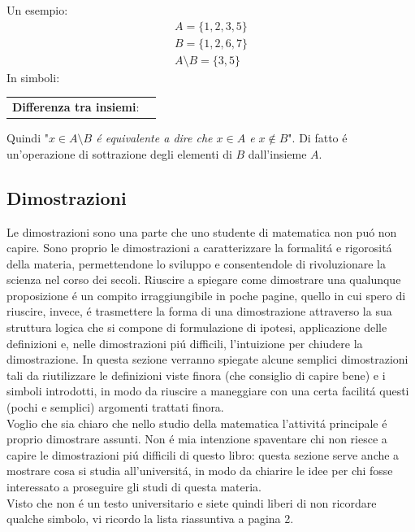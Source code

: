 \documentclass[twoside]{article} %
\begin{document}
	\noindent Un esempio:
	\begin{gather*}
		A=\{1,2,3,5\}\\
		B=\{1,2,6,7\}\\
		A\setminus B=\{3,5\}
	\end{gather*}
	In simboli:
	\begin{center}			
		\begin{tabular}{cl}
			\textbf{Differenza tra insiemi}:&\makecell[tl]{$x\in A\setminus B \Leftrightarrow x\in A \wedge x\notin B$}
		\end{tabular}
	\end{center}		
	Quindi "\textit{$x\in A\setminus B$ \'e equivalente a dire che $x\in A$ e $x\notin B$}". Di fatto \'e un'operazione di sottrazione degli elementi di $B$ dall'insieme $A$.\\
	\newpage
	\subsection{Dimostrazioni}
	Le dimostrazioni sono una parte che uno studente di matematica non pu\'o  non capire. Sono proprio le dimostrazioni a caratterizzare la formalit\'a e rigorosit\'a della materia, permettendone lo sviluppo e consentendole di rivoluzionare la scienza nel corso dei secoli. Riuscire a spiegare come dimostrare una qualunque proposizione \'e un compito irraggiungibile in poche pagine, quello in cui spero di riuscire, invece, \'e trasmettere la forma di una dimostrazione attraverso la sua struttura logica che si compone di formulazione di ipotesi, applicazione delle definizioni e, nelle dimostrazioni pi\'u difficili, l'intuizione per chiudere la dimostrazione. In questa sezione verranno spiegate alcune semplici dimostrazioni tali da riutilizzare le definizioni viste finora (che consiglio di capire bene) e i simboli introdotti, in modo da riuscire a maneggiare con una certa facilit\'a questi (pochi e semplici) argomenti trattati finora.\\
	Voglio che sia chiaro che nello studio della matematica l'attivit\'a principale \'e proprio dimostrare assunti. Non \'e mia intenzione spaventare chi non riesce a capire le dimostrazioni pi\'u difficili di questo libro: questa sezione serve anche a mostrare cosa si studia all'universit\'a, in modo da chiarire le idee per chi fosse interessato a proseguire gli studi di questa materia.\\
	Visto che non \'e un testo universitario e siete quindi liberi di non ricordare qualche simbolo, vi ricordo la lista riassuntiva a pagina 2.
	\newpage
	
\end{document}
